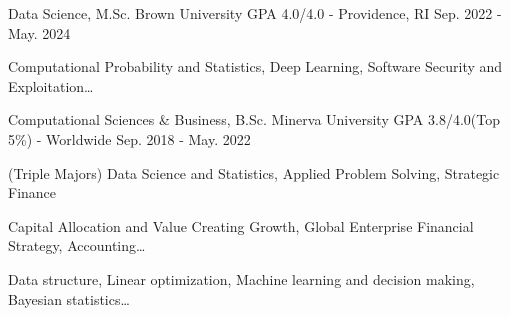 \begin{cventries}
  \cventry
    {Data Science, M.Sc.}
    {Brown University}
    {GPA 4.0/4.0 - Providence, RI}
    {Sep. 2022 - May. 2024}
    {
    \begin{cvitems}
        \item {Computational Probability and Statistics, Deep Learning, Software Security and Exploitation…}
    \end{cvitems}
    }

  \cventry
    {Computational Sciences \& Business, B.Sc.}
    {Minerva University}
    {GPA 3.8/4.0(Top 5\%) - Worldwide}
    {Sep. 2018 - May. 2022}
    {
      \begin{cvitems}
        \item {(Triple Majors)  Data Science and Statistics, Applied Problem Solving, Strategic Finance}
        \item {Capital Allocation and Value Creating Growth, Global Enterprise Financial Strategy, Accounting…}
        \item {Data structure, Linear optimization, Machine learning and decision making, Bayesian statistics…}
      \end{cvitems}
    }
\end{cventries}
